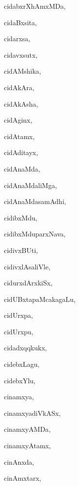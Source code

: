 \begin{multicols}{3}
{\noindent
{cidabxrXhAmxMDa}, \pageref{cidabxrXhAmxMDa}

\noindent
{cidaBxsita}, \pageref{cidaBxsita}

\noindent
{cidarxsa}, \pageref{cidarxsa}

\noindent
{cidavxsutx}, \pageref{cidavxsutx}

\noindent
{cidAMshika}, \pageref{cidAMshika}

\noindent
{cidAkAra}, \pageref{cidAkAra}

\noindent
{cidAkAsha}, \pageref{cidAkAsha}

\noindent
{cidAginx}, \pageref{cidAginx}

\noindent
{cidAtamx}, \pageref{cidAtamx}

\noindent
{cidAditayx}, \pageref{cidAditayx}

\noindent
{cidAnaMda}, \pageref{cidAnaMda}

\noindent
{cidAnaMdaliMga}, \pageref{cidAnaMdaliMga}

\noindent
{cidAnaMdasamAdhi}, \pageref{cidAnaMdasamAdhi}

\noindent
{cidibxMdu}, \pageref{cidibxMdu}

\noindent
{cidibxMduparxNava}, \pageref{cidibxMduparxNava}

\noindent
{cidivxBUti}, \pageref{cidivxBUti}

\noindent
{cidivxlAsaliVle}, \pageref{cidivxlAsaliVle}

\noindent
{cidurxdArxkiSx}, \pageref{cidurxdArxkiSx}

\noindent
{cidUBxtapaMcakagaLu}, \pageref{cidUBxtapaMcakagaLu}

\noindent
{cidUrxpa}, \pageref{cidUrxpa}

\noindent
{cidUrxpu}, \pageref{cidUrxpu}

\noindent
{cidadxqqkukx}, \pageref{cidadxqqkukx}

\noindent
{cidebxLagu}, \pageref{cidebxLagu}

\noindent
{cidebxYlu}, \pageref{cidebxYlu}

\noindent
{cinamxya}, \pageref{cinamxya}

\noindent
{cinamxyadiVkASx}, \pageref{cinamxyadiVkASx}

\noindent
{cinamxyAMDa}, \pageref{cinamxyAMDa}

\noindent
{cinamxyAtamx}, \pageref{cinamxyAtamx}

\noindent
{cinAnxda}, \pageref{cinAnxda}

\noindent
{cinAmxtarx}, \pageref{cinAmxtarx}

}
\end{multicols}
